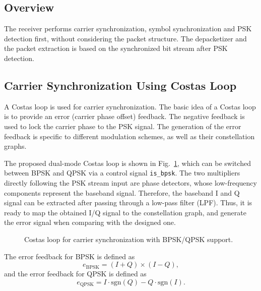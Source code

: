 \documentclass[journal,twoside]{IEEEtran}
\begin{document}
    \subsection{Overview}

      The receiver performs carrier synchronization, symbol synchronization and PSK detection first,
      without considering the packet structure.
      The depacketizer and the packet extraction is based on the synchronized bit stream after PSK detection.

    \subsection{Carrier Synchronization Using Costas Loop}

      A Costas loop \cite{simon1977optimum} is used for carrier synchronization.
      The basic idea of a Costas loop is to provide an error (carrier phase offset) feedback.
      The negative feedback is used to lock the carrier phase to the PSK signal.
      The generation of the error feedback is specific to different modulation schemes,
      as well as their constellation graphs.

      The proposed dual-mode Costas loop is shown in Fig.~\ref{fig:costas_loop},
      which can be switched between BPSK and QPSK via a control signal \texttt{is\_bpsk}.
      The two multipliers directly following the PSK stream input are phase detectors,
      whose low-frequency components represent the baseband signal.
      Therefore, the baseband I and Q signal can be extracted after passing through a low-pass filter (LPF).
      Thus, it is ready to map the obtained I/Q signal to the constellation graph,
      and generate the error signal when comparing with the designed one.
      \begin{figure}[htbp]
        \centering
        
        \caption{Costas loop for carrier synchronization with BPSK/QPSK support.}
        \label{fig:costas_loop}
      \end{figure}

      The error feedback for BPSK is defined as
      \begin{equation}
        e_{\text{BPSK}}=(I+Q)\times(I-Q),
      \end{equation}
      and the error feedback for QPSK is defined as
      \begin{equation}
        e_{\text{QPSK}}=I\cdot\mathrm{sgn}(Q)-Q\cdot\mathrm{sgn}(I).
      \end{equation}
\end{document}
